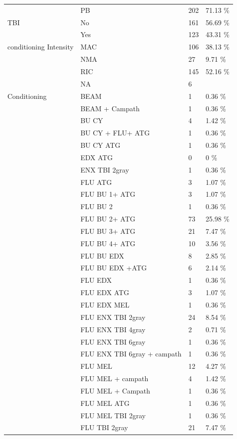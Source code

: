 \documentclass[a4paper,11pt] {article}
\begin{document}
\begin{longtable}{llll}
   & PB & 202 & 71.13 \% \\ 
  TBI & No & 161 & 56.69 \% \\ 
   & Yes & 123 & 43.31 \% \\ 
  conditioning Intensity & MAC & 106 & 38.13 \% \\ 
   & NMA & 27 & 9.71 \% \\ 
   & RIC & 145 & 52.16 \% \\ 
   & NA & 6 &  \\ 
  Conditioning & BEAM & 1 & 0.36 \% \\ 
   & BEAM + Campath & 1 & 0.36 \% \\ 
   & BU CY  & 4 & 1.42 \% \\ 
   & BU CY + FLU+ ATG & 1 & 0.36 \% \\ 
   & BU CY ATG & 1 & 0.36 \% \\ 
   & EDX ATG & 0 & 0 \% \\ 
   & ENX TBI 2gray & 1 & 0.36 \% \\ 
   & FLU ATG & 3 & 1.07 \% \\ 
   & FLU BU 1+ ATG & 3 & 1.07 \% \\ 
   & FLU BU 2 & 1 & 0.36 \% \\ 
   & FLU BU 2+ ATG & 73 & 25.98 \% \\ 
   & FLU BU 3+ ATG & 21 & 7.47 \% \\ 
   & FLU BU 4+ ATG & 10 & 3.56 \% \\ 
   & FLU BU EDX & 8 & 2.85 \% \\ 
   & FLU BU EDX +ATG & 6 & 2.14 \% \\ 
   & FLU EDX & 1 & 0.36 \% \\ 
   & FLU EDX ATG & 3 & 1.07 \% \\ 
   & FLU EDX MEL & 1 & 0.36 \% \\ 
   & FLU ENX TBI 2gray & 24 & 8.54 \% \\ 
   & FLU ENX TBI 4gray & 2 & 0.71 \% \\ 
   & FLU ENX TBI 6gray & 1 & 0.36 \% \\ 
   & FLU ENX TBI 6gray + campath & 1 & 0.36 \% \\ 
   & FLU MEL & 12 & 4.27 \% \\ 
   & FLU MEL + campath & 4 & 1.42 \% \\ 
   & FLU MEL + Campath & 1 & 0.36 \% \\ 
   & FLU MEL ATG & 1 & 0.36 \% \\ 
   & FLU MEL TBI 2gray & 1 & 0.36 \% \\ 
   & FLU TBI 2gray & 21 & 7.47 \% \\ 

\end{longtable}
\end{document}

